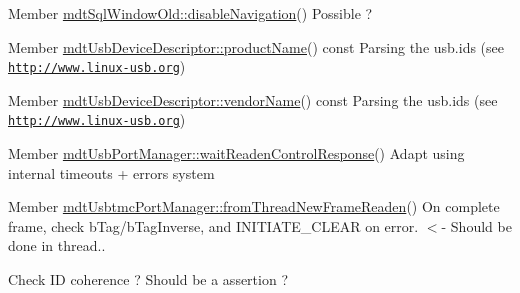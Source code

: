 \label{todo__todo000095}
\hypertarget{todo__todo000095}{}
 
\begin{DoxyDescription}
\item[Member \hyperlink{classmdt_sql_window_old_a5c1dd39dcead4e1f44e7c59c567caaeb}{mdtSqlWindowOld::disableNavigation}() ]Possible ? 
\end{DoxyDescription}

\label{todo__todo000054}
\hypertarget{todo__todo000054}{}
 
\begin{DoxyDescription}
\item[Member \hyperlink{classmdt_usb_device_descriptor_a626afc71d8e72600f12259ac6f5a5866}{mdtUsbDeviceDescriptor::productName}() const  ]Parsing the usb.ids (see \href{http://www.linux-usb.org}{\tt http://www.linux-\/usb.org}) 
\end{DoxyDescription}

\label{todo__todo000053}
\hypertarget{todo__todo000053}{}
 
\begin{DoxyDescription}
\item[Member \hyperlink{classmdt_usb_device_descriptor_ac2f746ebd5540b65bf00f82c991f5c3b}{mdtUsbDeviceDescriptor::vendorName}() const  ]Parsing the usb.ids (see \href{http://www.linux-usb.org}{\tt http://www.linux-\/usb.org}) 
\end{DoxyDescription}

\label{todo__todo000058}
\hypertarget{todo__todo000058}{}
 
\begin{DoxyDescription}
\item[Member \hyperlink{classmdt_usb_port_manager_a34bf0ac118e586bf2547a98964a2230c}{mdtUsbPortManager::waitReadenControlResponse}() ]Adapt using internal timeouts + errors system 
\end{DoxyDescription}

\label{todo__todo000060}
\hypertarget{todo__todo000060}{}
 
\begin{DoxyDescription}
\item[Member \hyperlink{classmdt_usbtmc_port_manager_aca42b343ae1f6a324e6e45968f03bbea}{mdtUsbtmcPortManager::fromThreadNewFrameReaden}() ]On complete frame, check bTag/bTagInverse, and INITIATE\_\-CLEAR on error. $<$-\/ Should be done in thread.. 

Check ID coherence ? Should be a assertion ? 
\end{DoxyDescription}

